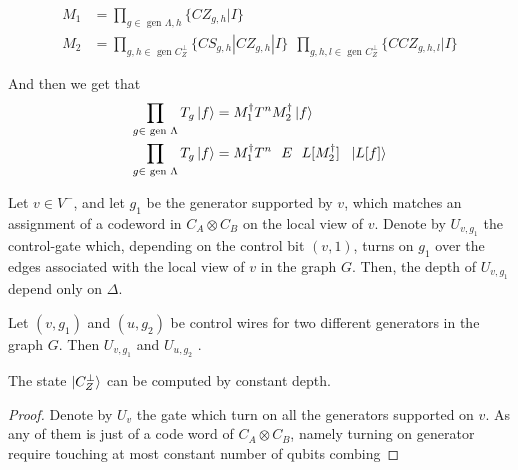 \documentclass[manuscript,screen,review]{acmart}
\begin{document}
\begin{equation*}
  \begin{split}
    M_{1} &= \prod_{g \in \text{ gen } \Lambda, h} \{ CZ_{g,h} | I \} \\
    M_{2} &= \prod_{g ,h \in \text{ gen } C_{Z}^{\perp}} \{ CS_{g,h} | CZ_{g,h} | I \} \ \ \prod_{g ,h, l \in \text{ gen } C_{Z}^{\perp}} \{ CCZ_{g,h,l} | I \}
  \end{split}
\end{equation*}

And then we get that
\begin{equation*}
  \begin{split}
    \prod_{g \in \text{ gen } \Lambda} T_{g} \ket{f} &=  M_{1}^{\dagger} T^{n}  M_{2}^{\dagger} \ket{f} \\
    \prod_{g \in \text{ gen }\Lambda} T_{g}\ket{f} &=  M_{1}^{\dagger} T^{n} \ \ E \ \ L[M_{2}^{\dagger}] \ \ \ket{L[f]}  
  \end{split}
\end{equation*}


\begin{claim} 
  Let $v \in V^{-}$, and let $g_{1}$ be the generator supported by $v$, which matches an assignment of a codeword in $C_{A}\otimes C_{B}$ on the local view of $v$. Denote by $U_{v, g_{1}}$ the control-gate which, depending on the control bit $(v,1)$, turns on $g_{1}$ over the edges associated with the local view of $v$ in the graph $G$. Then, the depth of $U_{v,g_{1}}$ depend only on $\Delta$.   
\end{claim}

\begin{claim}
  Let $(v,g_{1})$ and $(u,g_{2})$ be control wires for two different generators in the graph $G$. Then $U_{v,g_{1}}$ and $U_{u,g_{2}}$ . 
\end{claim}


\begin{claim}
  The state $\ket{C_{Z}^{\perp}}$ can be computed by constant depth. 
\end{claim}
\begin{proof}
  Denote by $U_{v}$ the gate which turn on all the generators supported on $v$. As any of them is just of a code word of $C_{A}\otimes C_{B}$, namely turning on generator require touching at most constant number of qubits combing  
\end{proof}
\end{document}
